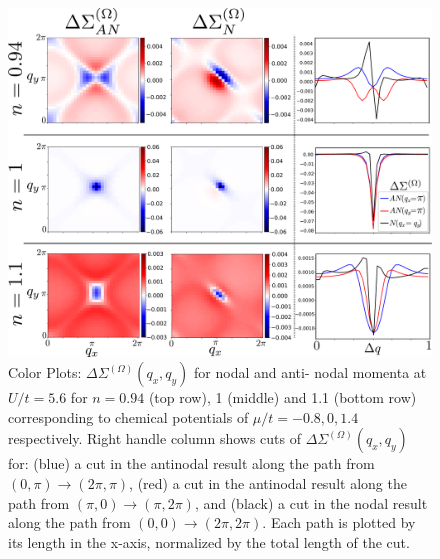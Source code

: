 \documentclass[twocolumn,notitlepage,prb,superscriptaddress,showpacs]{revtex4-1}
\begin{document}
\begin{figure}
\centering
    \includegraphics[width=\linewidth]{fig6.pdf}
\caption{\label{fig:fluct_DMFT_muvary} Color Plots: $\Delta \Sigma^{(\Omega)}(q_x,q_y)$ for nodal and anti- nodal momenta at $U/t= 5.6$ for $n=0.94$ (top row), 1 (middle) and 1.1 (bottom row) corresponding to chemical potentials of $\mu/t = -0.8, 0, 1.4 $ respectively.  Right handle column shows cuts of $\Delta \Sigma^{(\Omega)}(q_x,q_y)$ for: (blue) a cut in the antinodal result along the path from $(0,\pi) \to (2\pi,\pi)$, (red) a cut in the antinodal result along the path from $(\pi,0) \to (\pi,2\pi)$, and (black) a cut in the nodal result along the path from $(0,0)\to(2\pi,2\pi)$. Each path is plotted by its length in the x-axis, normalized by the total length of the cut. }
\end{figure} 
\end{document}
